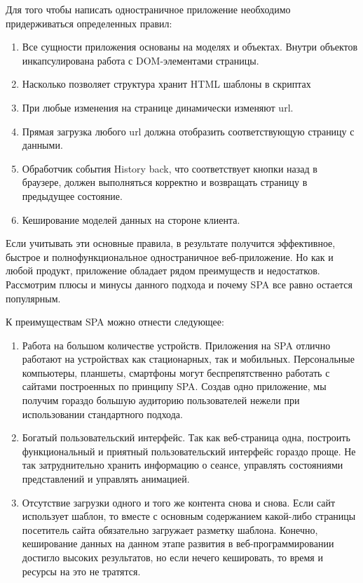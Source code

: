 Для того чтобы написать одностраничное приложение необходимо придерживаться определенных правил:
\begin{enumerate}
\item Все сущности приложения основаны на моделях и объектах. Внутри объектов инкапсулирована работа с DOM-элементами страницы.
\item Насколько позволяет структура хранит HTML шаблоны в скриптах
\item При любые изменения на странице динамически изменяют url.
\item Прямая загрузка любого url должна отобразить соответствующую страницу с данными.
\item Обработчик события History back, что соответствует кнопки назад в браузере, должен выполняться корректно и возвращать страницу в предыдущее состояние.
\item Кеширование моделей данных на стороне клиента.
\end{enumerate}

Если учитывать эти основные правила, в результате получится эффективное, быстрое и полнофункциональное одностраничное веб-приложение.   Но как и любой продукт, приложение обладает рядом преимуществ и недостатков. Рассмотрим плюсы и минусы данного подхода и почему SPA все равно остается популярным.

К преимуществам SPA можно отнести следующее:
\begin{enumerate}
\item Работа на большом количестве устройств. Приложения на SPA отлично работают на устройствах как стационарных, так и мобильных. Персональные компьютеры, планшеты, смартфоны могут беспрепятственно работать с сайтами построенных по принципу SPA. Создав одно приложение, мы получим гораздо большую аудиторию пользователей нежели при использовании стандартного подхода.
\item  Богатый пользовательский интерфейс. Так как веб-страница одна, построить функциональный и приятный пользовательский интерфейс гораздо проще. Не так затруднительно хранить информацию о сеансе, управлять состояниями представлений и управлять анимацией.
\item Отсутствие загрузки одного и того же контента снова и снова. Если сайт использует шаблон, то вместе с основным содержанием какой-либо страницы посетитель сайта обязательно загружает разметку шаблона. Конечно, кеширование данных на данном этапе развития в веб-программировании достигло высоких результатов, но если нечего кешировать, то время  и ресурсы на это не тратятся.
\end{enumerate}

